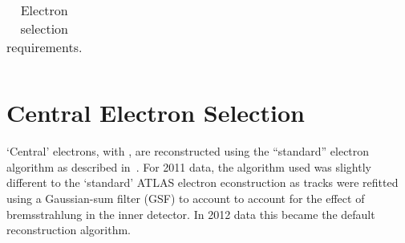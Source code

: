 \begin{table}[!htbp]
\begin{tabular}{ l  l l }
    \hline \hline
  \end{tabular}
   \caption{Electron selection requirements.}
   \label{table:objsel-el}
\end{table}

\section{Central Electron Selection}

`Central' electrons, with , are reconstructed using the
``standard'' electron algorithm as described in~.  For 2011
data, the algorithm used was slightly different to the `standard' ATLAS electron
econstruction as tracks were refitted using a Gaussian-sum filter (GSF) to
account to account for the effect of bremsstrahlung in the inner detector. In
2012 data this became the default reconstruction algorithm.

